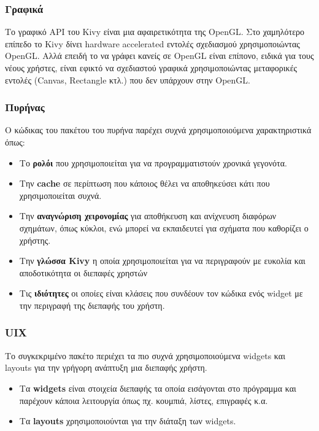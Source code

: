 \subsubsection{Γραφικά}
Το γραφικό API του Kivy είναι μια αφαιρετικότητα της OpenGL. Στο χαμηλότερο επίπεδο το Kivy δίνει hardware accelerated εντολές σχεδιασμού χρησιμοποιώντας OpenGL. Αλλά επειδή το να γράφει κανείς σε OpenGL είναι επίπονο, ειδικά για τους νέους χρήστες, είναι εφικτό να σχεδιαστού γραφικά χρησιμοποιώντας μεταφορικές εντολές (Canvas, Rectangle κτλ.) που δεν υπάρχουν στην OpenGL.  

\subsubsection{Πυρήνας}
Ο κώδικας του πακέτου του πυρήνα παρέχει συχνά χρησιμοποιούμενα χαρακτηριστικά όπως:
\begin{itemize}
    \item Το \textbf{ρολόι} που χρησιμοποιείται για να προγραμματιστούν χρονικά γεγονότα.
    \item Την \textbf{cache} σε περίπτωση που κάποιος θέλει να αποθηκεύσει κάτι που χρησιμοποιείται συχνά.
    \item Την \textbf{αναγνώριση χειρονομίας} για αποθήκευση και ανίχνευση διαφόρων σχημάτων, όπως κύκλοι, ενώ μπορεί να εκπαιδευτεί για σχήματα που καθορίζει ο χρήστης.
    \item Την \textbf{γλώσσα Kivy} η οποία χρησιμοποιείται για να περιγραφούν με ευκολία και αποδοτικότητα οι διεπαφές χρηστών
    \item Τις \textbf{ιδιότητες} οι οποίες είναι κλάσεις που συνδέουν τον κώδικα ενός widget με την περιγραφή της διεπαφής του χρήστη.
\end{itemize}

\subsubsection{UIX}
Το συγκεκριμένο πακέτο περιέχει τα πιο συχνά χρησιμοποιούμενα widgets και layouts για την γρήγορη ανάπτυξη μια διεπαφής χρήστη.
\begin{itemize}
    \item Τα \textbf{widgets} είναι στοιχεία διεπαφής τα οποία εισάγονται στο πρόγραμμα και παρέχουν κάποια λειτουργία όπως πχ. κουμπιά, λίστες, επιγραφές κ.α.
    \item Τα \textbf{layouts} χρησιμοποιούνται για την διάταξη των widgets.
\end{itemize}
